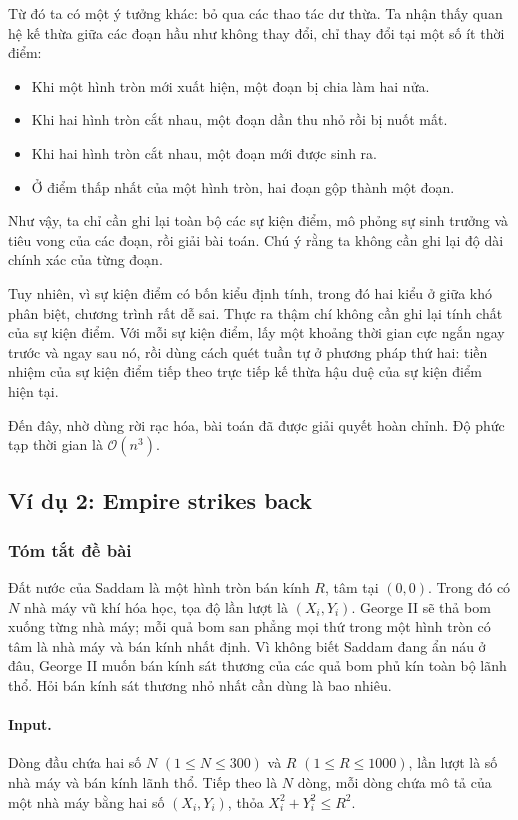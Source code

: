 \documentclass[11pt]{article}
\newcommand{\Oh}{\mathcal{O}}
\begin{document}
Từ đó ta có một ý tưởng khác: bỏ qua các thao tác dư thừa. Ta nhận thấy quan
hệ kế thừa giữa các đoạn hầu như không thay đổi, chỉ thay đổi tại một số ít
thời điểm:
\begin{itemize}
  \item Khi một hình tròn mới xuất hiện, một đoạn bị chia làm hai nửa.
  \item Khi hai hình tròn cắt nhau, một đoạn dần thu nhỏ rồi bị nuốt mất.
  \item Khi hai hình tròn cắt nhau, một đoạn mới được sinh ra.
  \item Ở điểm thấp nhất của một hình tròn, hai đoạn gộp thành một đoạn.
\end{itemize}

Như vậy, ta chỉ cần ghi lại toàn bộ các sự kiện điểm, mô phỏng sự sinh trưởng
và tiêu vong của các đoạn, rồi giải bài toán. Chú ý rằng ta không cần ghi lại
độ dài chính xác của từng đoạn.

Tuy nhiên, vì sự kiện điểm có bốn kiểu định tính, trong đó hai kiểu ở giữa khó
phân biệt, chương trình rất dễ sai. Thực ra thậm chí không cần ghi lại tính
chất của sự kiện điểm. Với mỗi sự kiện điểm, lấy một khoảng thời gian cực ngắn
ngay trước và ngay sau nó, rồi dùng cách quét tuần tự ở phương pháp thứ hai:
tiền nhiệm của sự kiện điểm tiếp theo trực tiếp kế thừa hậu duệ của sự kiện
điểm hiện tại.

Đến đây, nhờ dùng rời rạc hóa, bài toán đã được giải quyết hoàn chỉnh. Độ phức
tạp thời gian là \(\Oh(n^3)\).

\subsection{Ví dụ 2: Empire strikes back}

\subsubsection*{Tóm tắt đề bài}

Đất nước của Saddam là một hình tròn bán kính \(R\), tâm tại \((0,0)\). Trong
đó có \(N\) nhà máy vũ khí hóa học, tọa độ lần lượt là \((X_i,Y_i)\). George
II sẽ thả bom xuống từng nhà máy; mỗi quả bom san phẳng mọi thứ trong một
hình tròn có tâm là nhà máy và bán kính nhất định. Vì không biết Saddam đang
ẩn náu ở đâu, George II muốn bán kính sát thương của các quả bom phủ kín toàn
bộ lãnh thổ. Hỏi bán kính sát thương nhỏ nhất cần dùng là bao nhiêu.

\paragraph{Input.}
Dòng đầu chứa hai số \(N\) \((1\le N\le 300)\) và \(R\)
\((1\le R\le 1000)\), lần lượt là số nhà máy và bán kính lãnh thổ. Tiếp theo
là \(N\) dòng, mỗi dòng chứa mô tả của một nhà máy bằng hai số
\((X_i,Y_i)\), thỏa \(X_i^2+Y_i^2\le R^2\).
\end{document}
